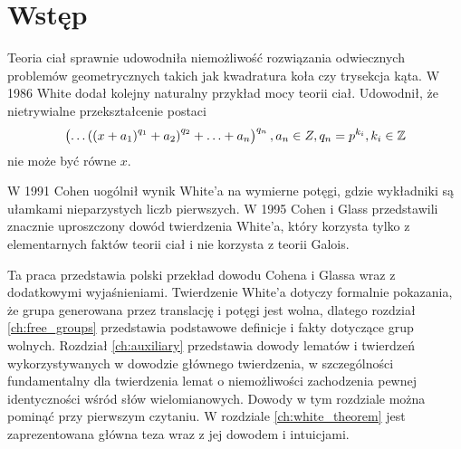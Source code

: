 \chapter{Wstęp}

Teoria ciał sprawnie udowodniła niemożliwość rozwiązania odwiecznych problemów
geometrycznych takich jak kwadratura koła czy trysekcja kąta. W 1986 White
\cite{whi88} dodał kolejny naturalny przykład mocy teorii ciał. Udowodnił, że
nietrywialne przekształcenie postaci
\[
  \left( \ldots \left(\left(x + a_1\right)^{q_1} + a_2\right)^{q_2} +
    \ldots + a_n\right)^{q_n}, a_n \in Z, q_n = p^{k_i}, k_i \in \mathbb{Z}
\]
nie może być równe $x$.

W 1991 Cohen \cite{coh91} uogólnił wynik White'a na wymierne potęgi, gdzie
wykładniki są ułamkami nieparzystych liczb pierwszych. W 1995 Cohen i Glass
\cite{coh95} przedstawili znacznie uproszczony dowód twierdzenia White'a, który
korzysta tylko z elementarnych faktów teorii ciał i nie korzysta z teorii
Galois.

Ta praca przedstawia polski przekład dowodu Cohena i Glassa wraz z dodatkowymi
wyjaśnieniami. Twierdzenie White'a dotyczy formalnie pokazania, że
grupa generowana przez translację i potęgi jest wolna, dlatego rozdział
\ref{ch:free_groups} przedstawia podstawowe definicje i fakty dotyczące grup
wolnych. Rozdział \ref{ch:auxiliary} przedstawia dowody lematów i twierdzeń
wykorzystywanych w dowodzie głównego twierdzenia, w szczególności fundamentalny
dla twierdzenia lemat o niemożliwości zachodzenia pewnej identyczności wśród
słów wielomianowych. Dowody w tym rozdziale można pominąć przy pierwszym
czytaniu. W rozdziale \ref{ch:white_theorem} jest zaprezentowana główna teza
wraz z jej dowodem i intuicjami.
